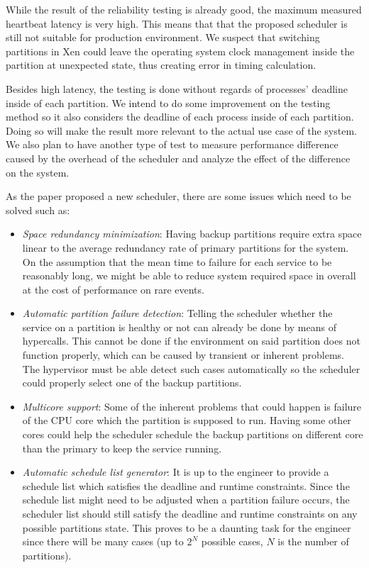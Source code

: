 \documentclass[conference]{IEEEtran}
\begin{document}
While the result of the reliability testing is already good, the maximum measured heartbeat
latency is very high. This means that that the proposed scheduler is still not suitable for
production environment. We suspect that switching partitions in Xen could leave the operating
system clock management inside the partition at unexpected state, thus creating error in timing
calculation.

Besides high latency, the testing is done without regards of processes' deadline inside of each
partition. We intend to do some improvement on the testing method so it also considers the
deadline of each process inside of each partition. Doing so will make the result more relevant
to the actual use case of the system. We also plan to have another type of test to measure
performance difference caused by the overhead of the scheduler and analyze the effect of the
difference on the system.

As the paper proposed a new scheduler, there are some issues which need to be solved such as:

\begin{itemize}

	\item \textit{Space redundancy minimization}: Having backup partitions require extra
		space linear to the average redundancy rate of primary partitions for the
		system. On the assumption that the mean time to failure for each service to be
		reasonably long, we might be able to reduce system required space in overall at
		the cost of performance on rare events.

	\item \textit{Automatic partition failure detection}: Telling the scheduler whether the
		service on a partition is healthy or not can already be done by means of
		hypercalls. This cannot be done if the environment on said partition does not
		function properly, which can be caused by transient or inherent problems. The
		hypervisor must be able detect such cases automatically so the scheduler could
		properly select one of the backup partitions.

	\item \textit{Multicore support}: Some of the inherent problems that could happen is
		failure of the CPU core which the partition is supposed to run.
		Having some other cores could help the scheduler schedule the backup partitions
		on different core than the primary to keep the service running.

		\newpage

	\item \textit{Automatic schedule list generator}: It is up to the engineer to provide a
		schedule list which satisfies the deadline and runtime constraints. Since the
		schedule list might need to be adjusted when a partition failure occurs, the
		scheduler list should still satisfy the deadline and runtime constraints on
		any possible partitions state. This proves to be a daunting task for the
		engineer since there will be many cases (up to $2^N$ possible cases, $N$ is the
		number of partitions).

\end{itemize}
\end{document}
